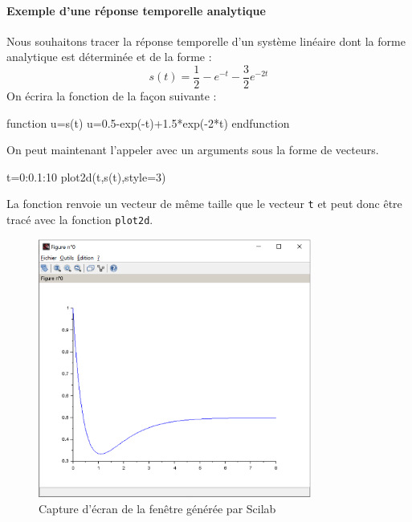 \paragraph{Exemple d'une réponse temporelle analytique}
Nous souhaitons tracer la réponse temporelle d'un système linéaire dont la
forme analytique est déterminée et de la forme :
\[
s(t)=\dfrac{1}{2}-e^{-t}-\dfrac{3}{2}e^{-2t}
\]
On écrira la fonction de la façon suivante :
\begin{Scilabcode}
function u=s(t)
    u=0.5-exp(-t)+1.5*exp(-2*t)
endfunction
\end{Scilabcode}
On peut maintenant l'appeler avec un arguments sous la forme de vecteurs. 
\begin{Scilabcode}
t=0:0.1:10
plot2d(t,s(t),style=3)
\end{Scilabcode}
La fonction renvoie un vecteur de même taille que le vecteur \verb?t? et peut
donc être tracé avec la fonction \verb?plot2d?.
\begin{figure}[!hb]
    \centering
    \includegraphics[width=0.8\textwidth]{fig/capture_SCILAB-fonction.eps}
    \caption{Capture d'écran de la fenêtre générée par Scilab}
\end{figure}
